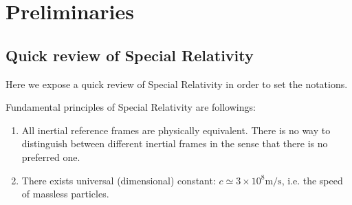 \documentclass[../main/main.tex]{subfiles}
\begin{document}
\chapter{Preliminaries}
\section{Quick review of Special Relativity}

Here we expose a quick review of Special Relativity in order to set the notations.

\skipline
Fundamental principles of Special Relativity are followings:
\begin{enumerate}
\item All inertial reference frames are physically equivalent. There is no way to distinguish between different inertial frames in the sense that there is no preferred one. 
\item There exists universal (dimensional) constant: $c\simeq3\times10^8\text{m/s}$, i.e. the speed of massless particles.
\end{enumerate}
\end{document}
